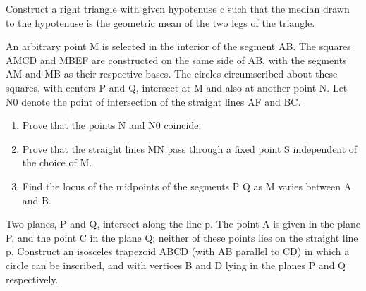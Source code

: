 \item Construct a right triangle with given hypotenuse c such that the median drawn to the hypotenuse is the geometric mean of the two legs of the triangle.

\item An arbitrary point M is selected in the interior of the segment AB. The squares AMCD and MBEF are constructed on the same side of AB, with the segments AM and MB as their respective bases. The circles circumscribed about these squares, with centers P and Q, intersect at M and also at another point N. Let N0 denote the point of intersection of the straight lines AF and BC.
\begin{enumerate}
\item  Prove that the points N and N0 coincide.
\item  Prove that the straight lines MN pass through a fixed point S independent of the choice of M.
\item  Find the locus of the midpoints of the segments P Q as M varies between A and B.
\end{enumerate}

\item Two planes, P and Q, intersect along the line p. The point A is given in the plane P, and the point C in the plane Q; neither of these points lies on the straight line p. Construct an isosceles trapezoid ABCD (with AB parallel to CD) in which a circle can be inscribed, and with vertices B and D lying in the planes P and Q respectively.


















